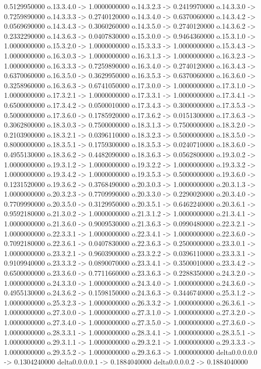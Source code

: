 0.5129950000    o.13.3.4.0 -> 1.0000000000    o.14.3.2.3 -> 0.2419970000    o.14.3.3.0 -> 0.7259890000    o.14.3.3.3 -> 0.2740120000    o.14.3.4.0 -> 0.6370060000    o.14.3.4.2 -> 0.0569690000    o.14.3.4.3 -> 0.3060260000    o.14.3.5.0 -> 0.2740120000    o.14.3.6.2 -> 0.2332290000    o.14.3.6.3 -> 0.0407830000    o.15.3.0.0 -> 0.9464360000    o.15.3.1.0 -> 1.0000000000    o.15.3.2.0 -> 1.0000000000    o.15.3.3.3 -> 1.0000000000    o.15.3.4.3 -> 1.0000000000    o.16.3.0.3 -> 1.0000000000    o.16.3.1.3 -> 1.0000000000    o.16.3.2.3 -> 1.0000000000    o.16.3.3.3 -> 0.7259890000    o.16.3.4.0 -> 0.2740120000    o.16.3.4.3 -> 0.6370060000    o.16.3.5.0 -> 0.3629950000    o.16.3.5.3 -> 0.6370060000    o.16.3.6.0 -> 0.3258960000    o.16.3.6.3 -> 0.6741050000    o.17.3.0.0 -> 1.0000000000    o.17.3.1.0 -> 1.0000000000    o.17.3.2.1 -> 1.0000000000    o.17.3.3.1 -> 1.0000000000    o.17.3.4.1 -> 0.6500000000    o.17.3.4.2 -> 0.0500010000    o.17.3.4.3 -> 0.3000000000    o.17.3.5.3 -> 0.5000000000    o.17.3.6.0 -> 0.1785920000    o.17.3.6.2 -> 0.0151300000    o.17.3.6.3 -> 0.3062800000    o.18.3.0.3 -> 0.7500000000    o.18.3.1.3 -> 0.7500000000    o.18.3.2.0 -> 0.2103900000    o.18.3.2.1 -> 0.0396110000    o.18.3.2.3 -> 0.5000000000    o.18.3.5.0 -> 0.8000000000    o.18.3.5.1 -> 0.1759300000    o.18.3.5.3 -> 0.0240710000    o.18.3.6.0 -> 0.4955130000    o.18.3.6.2 -> 0.4482090000    o.18.3.6.3 -> 0.0562800000    o.19.3.0.2 -> 1.0000000000    o.19.3.1.2 -> 1.0000000000    o.19.3.2.2 -> 1.0000000000    o.19.3.3.2 -> 1.0000000000    o.19.3.4.2 -> 1.0000000000    o.19.3.5.3 -> 0.5000000000    o.19.3.6.0 -> 0.1231520000    o.19.3.6.2 -> 0.3768490000    o.20.3.0.3 -> 1.0000000000    o.20.3.1.3 -> 1.0000000000    o.20.3.2.3 -> 0.7709990000    o.20.3.3.0 -> 0.2290020000    o.20.3.4.0 -> 0.7709990000    o.20.3.5.0 -> 0.3129950000    o.20.3.5.1 -> 0.6462240000    o.20.3.6.1 -> 0.9592180000    o.21.3.0.2 -> 1.0000000000    o.21.3.1.2 -> 1.0000000000    o.21.3.4.1 -> 1.0000000000    o.21.3.6.0 -> 0.9009530000    o.21.3.6.3 -> 0.0990480000    o.22.3.2.1 -> 1.0000000000    o.22.3.3.1 -> 1.0000000000    o.22.3.4.1 -> 1.0000000000    o.22.3.6.0 -> 0.7092180000    o.22.3.6.1 -> 0.0407830000    o.22.3.6.3 -> 0.2500000000    o.23.3.0.1 -> 1.0000000000    o.23.3.2.1 -> 0.9603900000    o.23.3.2.2 -> 0.0396110000    o.23.3.3.1 -> 0.9109940000    o.23.3.3.2 -> 0.0890070000    o.23.3.4.1 -> 0.3500010000    o.23.3.4.2 -> 0.6500000000    o.23.3.6.0 -> 0.7711660000    o.23.3.6.3 -> 0.2288350000    o.24.3.2.0 -> 1.0000000000    o.24.3.3.0 -> 1.0000000000    o.24.3.4.0 -> 1.0000000000    o.24.3.6.0 -> 0.4955130000    o.24.3.6.2 -> 0.1598150000    o.24.3.6.3 -> 0.3446740000    o.25.3.1.2 -> 1.0000000000    o.25.3.2.3 -> 1.0000000000    o.26.3.3.2 -> 1.0000000000    o.26.3.6.1 -> 1.0000000000    o.27.3.0.0 -> 1.0000000000    o.27.3.1.0 -> 1.0000000000    o.27.3.2.0 -> 1.0000000000    o.27.3.4.0 -> 1.0000000000    o.27.3.5.0 -> 1.0000000000    o.27.3.6.0 -> 1.0000000000    o.28.3.3.1 -> 1.0000000000    o.28.3.4.1 -> 1.0000000000    o.28.3.5.1 -> 1.0000000000    o.29.3.1.1 -> 1.0000000000    o.29.3.2.1 -> 1.0000000000    o.29.3.3.3 -> 1.0000000000    o.29.3.5.2 -> 1.0000000000    o.29.3.6.3 -> 1.0000000000    delta0.0.0.0.0 -> 0.1304240000    delta0.0.0.0.1 -> 0.1884040000    delta0.0.0.0.2 -> 0.1884040000    